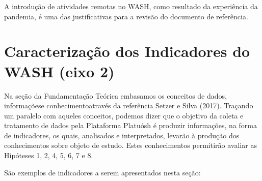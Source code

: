 \documentclass[
12pt,		%
openright,	%
twoside,  %
a4paper,			%
chapter=TITLE,		%
english,			%
french,				%
spanish,			%
brazil				%
]{USPSC-classe/USPSC}
\begin{document}
A introdu\c{c}\~ao de atividades remotas no WASH, como resultado da experi\^encia da pandemia, \'e uma das justificativas para a revis\~ao do documento de refer\^encia.

















\section[Caracteriza\c{c}\~ao dos Indicadores do WASH (eixo 2)]{Caracteriza\c{c}\~ao dos Indicadores do WASH (eixo 2)}\label{Caracteriza\c{c}\~ao dos Indicadores do WASH (eixo 2)}
Na se\c{c}\~ao da Fundamenta\c{c}\~ao Te\'orica embasamos os conceitos de \textquotedbl dados\textquotedbl , \textquotedbl informa\c{c}\~oes\textquotedbl  e \textquotedbl conhecimento\textquotedbl   atrav\'es da refer\^encia  Setzer e Silva (2017). Tra\c{c}ando um paralelo com aqueles conceitos, podemos dizer que o objetivo da coleta e tratamento de dados pela Plataforma Platu\'osh \'e produzir informa\c{c}\~oes, na forma de indicadores, os quais, analisados e interpretados, levar\~ao \`a produ\c{c}\~ao dos conhecimentos sobre objeto de estudo. Estes conhecimentos permitir\~ao avaliar as Hip\'oteses 1, 2, 4, 5, 6, 7 e 8.

















S\~ao exemplos de indicadores a serem apresentados nesta se\c{c}\~ao:
\end{document}
